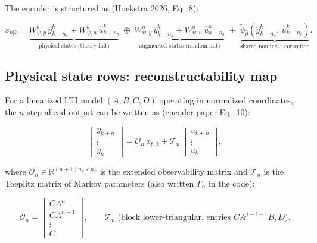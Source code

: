 \documentclass[11pt,a4paper]{article}
\begin{document}
The encoder is structured as (Hoekstra 2026, Eq.\ 8):

\begin{equation}
  \hat{x}_{k|k} =
  \underbrace{W_{\psi,y}^b\, \hat{y}_{k-n_a}^{k}
            + W_{\psi,u}^b\, \hat{u}_{k-n_b}^{k}}_{\text{physical states (theory init)}}
  \;\oplus\;
  \underbrace{W_{\psi,y}^a\, \hat{y}_{k-n_a}^{k}
            + W_{\psi,u}^a\, \hat{u}_{k-n_b}^{k}}_{\text{augmented states (random init)}}
  \;+\;
  \underbrace{\tilde{\psi}_{\tilde{\theta}}\!\left(\hat{y}_{k-n_a}^{k},\, \hat{u}_{k-n_b}^{k}\right)}_{\text{shared nonlinear correction}}.
  \label{eq:encoder_full}
\end{equation}

\subsection{Physical state rows: reconstructability map}

For a linearized LTI model $(A, B, C, D)$ operating in normalized coordinates,
the $n$-step ahead output can be written as (encoder paper Eq.\ 10):

\begin{equation}
  \begin{bmatrix} y_{k+n} \\ \vdots \\ y_k \end{bmatrix}
  = \mathcal{O}_n\, x_{b,k}
  + \mathcal{T}_n\, \begin{bmatrix} u_{k+n} \\ \vdots \\ u_k \end{bmatrix},
  \label{eq:obs_eqn}
\end{equation}

where $\mathcal{O}_n \in \mathbb{R}^{(n+1)n_y \times n_x}$ is the extended
observability matrix and $\mathcal{T}_n$ is the Toeplitz matrix of Markov
parameters (also written $\Gamma_n$ in the code):

\begin{equation}
  \mathcal{O}_n =
  \begin{bmatrix} CA^n \\ CA^{n-1} \\ \vdots \\ C \end{bmatrix}, \qquad
  \mathcal{T}_n \;\text{(block lower-triangular, entries } CA^{j-i-1}B, D\text{)}.
  \label{eq:On_Tn}
\end{equation}
\end{document}
